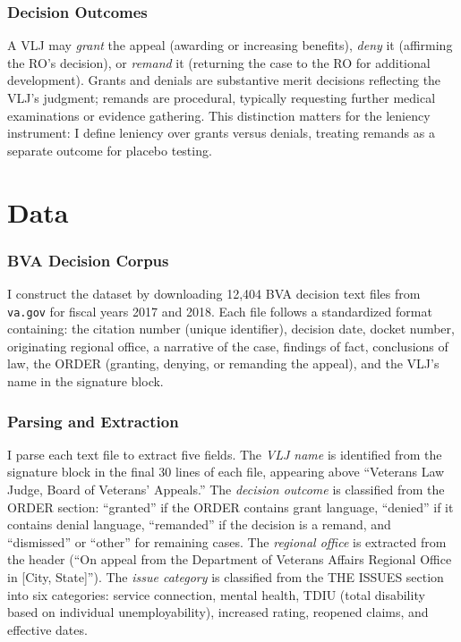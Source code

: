 \documentclass[12pt]{article}
\begin{document}
\subsubsection*{Decision Outcomes} A VLJ may \textit{grant} the appeal (awarding or increasing benefits), \textit{deny} it (affirming the RO's decision), or \textit{remand} it (returning the case to the RO for additional development). Grants and denials are substantive merit decisions reflecting the VLJ's judgment; remands are procedural, typically requesting further medical examinations or evidence gathering. This distinction matters for the leniency instrument: I define leniency over grants versus denials, treating remands as a separate outcome for placebo testing.


\section{Data}

\subsubsection*{BVA Decision Corpus} I construct the dataset by downloading 12,404 BVA decision text files from \texttt{va.gov} for fiscal years 2017 and 2018. Each file follows a standardized format containing: the citation number (unique identifier), decision date, docket number, originating regional office, a narrative of the case, findings of fact, conclusions of law, the ORDER (granting, denying, or remanding the appeal), and the VLJ's name in the signature block.

\subsubsection*{Parsing and Extraction} I parse each text file to extract five fields. The \textit{VLJ name} is identified from the signature block in the final 30 lines of each file, appearing above ``Veterans Law Judge, Board of Veterans' Appeals.'' The \textit{decision outcome} is classified from the ORDER section: ``granted'' if the ORDER contains grant language, ``denied'' if it contains denial language, ``remanded'' if the decision is a remand, and ``dismissed'' or ``other'' for remaining cases. The \textit{regional office} is extracted from the header (``On appeal from the Department of Veterans Affairs Regional Office in [City, State]''). The \textit{issue category} is classified from the THE ISSUES section into six categories: service connection, mental health, TDIU (total disability based on individual unemployability), increased rating, reopened claims, and effective dates.
\end{document}

